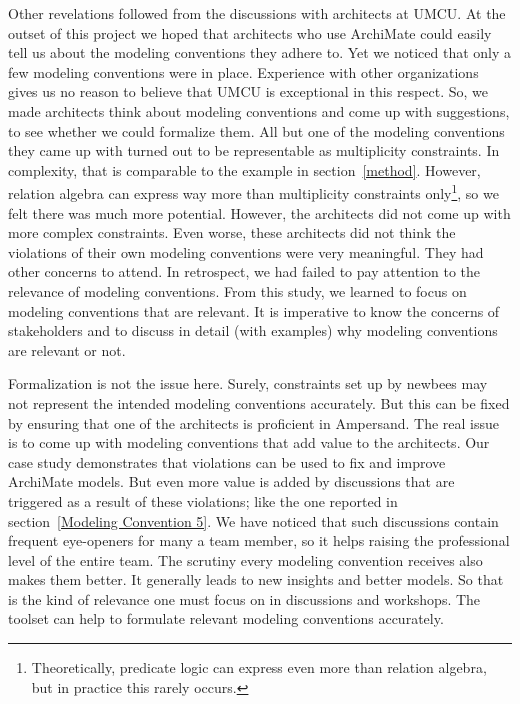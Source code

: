 \documentclass[sn-vancouver]{sn-jnl}%
\begin{document}
Other revelations followed from the discussions with architects at UMCU.
At the outset of this project we hoped that architects who use ArchiMate could easily tell us about the modeling conventions they adhere to.
Yet we noticed that only a few modeling conventions were in place.
Experience with other organizations gives us no reason to believe that UMCU is exceptional in this respect.
So, we made architects think about modeling conventions and come up with suggestions,
to see whether we could formalize them.
All but one of the modeling conventions they came up with turned out to be representable as multiplicity constraints.
In complexity, that is comparable to the example in section~\ref{method}.
However, relation algebra can express way more than multiplicity constraints only\footnote{Theoretically, predicate logic can express even more than relation algebra, but in practice this rarely occurs.}, so we felt there was much more potential.
However, the architects did not come up with more complex constraints.
Even worse, these architects did not think the violations of their own modeling conventions were very meaningful.
They had other concerns to attend.
In retrospect, we had failed to pay attention to the relevance of modeling conventions.
From this study, we learned to focus on modeling conventions that are relevant.
It is imperative to know the concerns of stakeholders and to discuss in detail (with examples) why modeling conventions are relevant or not.

Formalization is not the issue here.
Surely, constraints set up by newbees may not represent the intended modeling conventions accurately.
But this can be fixed by ensuring that one of the architects is proficient in Ampersand.
The real issue is to come up with modeling conventions that add value to the architects.
Our case study demonstrates that violations can be used to fix and improve ArchiMate models.
But even more value is added by discussions that are triggered as a result of these violations;
like the one reported in section~\ref{Modeling Convention 5}.
We have noticed that such discussions contain frequent eye-openers for many a team member,
so it helps raising the professional level of the entire team.
The scrutiny every modeling convention receives also makes them better.
It generally leads to new insights and better models.
So that is the kind of relevance one must focus on in discussions and workshops.
The toolset can help to formulate relevant modeling conventions accurately.
\end{document}
